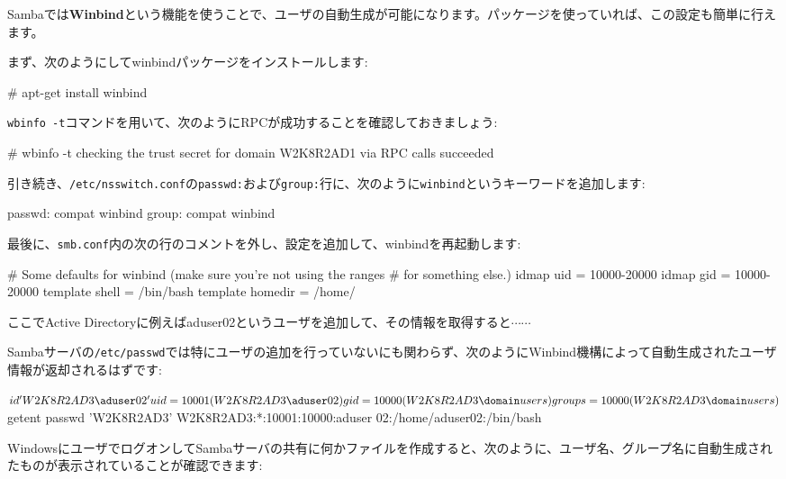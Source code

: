 \documentclass[mingoth,a4paper]{jsarticle}
\begin{document}
Sambaでは{\bf{Winbind}}という機能を使うことで、ユーザの自動生成が可能になります。パッケージを使っていれば、この設定も簡単に行えます。

まず、次のようにしてwinbindパッケージをインストールします:

\begin{commandline}
# apt-get install winbind
\end{commandline}

{\tt{wbinfo -t}}コマンドを用いて、次のようにRPCが成功することを確認しておきましょう:

\begin{commandline}
# wbinfo -t
checking the trust secret for domain W2K8R2AD1 via RPC calls succeeded
\end{commandline}

引き続き、{\tt{/etc/nsswitch.conf}}の{\tt{passwd:}}および{\tt{group:}}行に、次のように{\tt{winbind}}というキーワードを追加します:

\begin{commandline}
passwd:         compat winbind
group:          compat winbind
\end{commandline}

最後に、{\tt{smb.conf}}内の次の行のコメントを外し、設定を追加して、winbindを再起動します:

\begin{commandline}
# Some defaults for winbind (make sure you're not using the ranges
# for something else.)
   idmap uid = 10000-20000
   idmap gid = 10000-20000
   template shell = /bin/bash
   template homedir = /home/%
\end{commandline}

ここでActive Directoryに例えばaduser02というユーザを追加して、その情報を取得すると$\cdots \cdots$

Sambaサーバの{\tt{/etc/passwd}}では特にユーザの追加を行っていないにも関わらず、次のようにWinbind機構によって自動生成されたユーザ情報が返却されるはずです:

\begin{commandline}
$ id 'W2K8R2AD3\aduser02'
uid=10001(W2K8R2AD3\aduser02) gid=10000(W2K8R2AD3\domain users) groups=10000(W2K8R2AD3\domain users)
$ getent passwd  'W2K8R2AD3'
W2K8R2AD3:*:10001:10000:aduser 02:/home/aduser02:/bin/bash
\end{commandline}

WindowsにユーザでログオンしてSambaサーバの共有に何かファイルを作成すると、次のように、ユーザ名、グループ名に自動生成されたものが表示されていることが確認できます:
\end{document}

